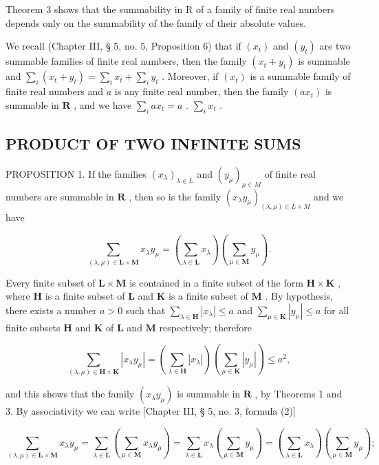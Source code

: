 Theorem 3 shows that the summability in R of a family of finite real numbers depends only on the summability of the family of their absolute values.

We recall (Chapter III, § 5, no. 5, Proposition 6) that if \((x_{t})\) and \((y_{t})\) are two summable families of finite real numbers, then the family \((x_{t} + y_{t})\) is summable and \(\sum_{i}(x_{t} + y_{t}) = \sum_{i}x_{t} + \sum_{i}y_{t}\) . Moreover, if \((x_{t})\) is a summable family of finite real numbers and \(a\) is any finite real number, then the family \((ax_{t})\) is summable in \(\mathbf{R}\) , and we have \(\sum_{i}ax_{t} = a\) . \(\sum_{i}x_{t}\) .

\subsection{PRODUCT OF TWO INFINITE SUMS}

PROPOSITION 1. If the families \((x_{\lambda})_{\lambda \in L}\) and \((y_{\mu})_{\mu \in M}\) of finite real numbers are summable in \(\mathbf{R}\) , then so is the family \((x_{\lambda}y_{\mu})_{(\lambda ,\mu)\in L\times M}\) and we have

\[
\sum_ {(\lambda , \mu) \in \mathbf {L} \times \mathbf {M}} x _ {\lambda} y _ {\mu} = (\sum_ {\lambda \in \mathbf {L}} x _ {\lambda}) (\sum_ {\mu \in \mathbf {M}} y _ {\mu}).\tag{1}
\]

Every finite subset of \(\mathbf{L} \times \mathbf{M}\) is contained in a finite subset of the form \(\mathbf{H} \times \mathbf{K}\) , where \(\mathbf{H}\) is a finite subset of \(\mathbf{L}\) and \(\mathbf{K}\) is a finite subset of \(\mathbf{M}\) . By hypothesis, there exists a number \(a > 0\) such that \(\sum_{\lambda \in \mathbf{H}} |x_{\lambda}| \leqslant a\) and \(\sum_{\mu \in \mathbf{K}} |y_{\mu}| \leqslant a\) for all finite subsets \(\mathbf{H}\) and \(\mathbf{K}\) of \(\mathbf{L}\) and \(\mathbf{M}\) respectively; therefore

\[
\sum_ {(\lambda , \mu) \in \mathbf {H} \times \mathbf {K}} | x _ {\lambda} y _ {\mu} | = (\sum_ {\lambda \in \mathbf {H}} | x _ {\lambda} |) (\sum_ {\mu \in \mathbf {K}} | y _ {\mu} |) \leqslant a ^ {2},
\]

and this shows that the family \((x_{\lambda}y_{\mu})\) is summable in \(\mathbf{R}\) , by Theorems 1 and 3. By associativity we can write {[}Chapter III, § 5, no. 3, formula (2){]}

\[
\sum_ {(\lambda , \mu) \in \mathbf {L} \times \mathbf {M}} x _ {\lambda} y _ {\mu} = \sum_ {\lambda \in \mathbf {L}} (\sum_ {\mu \in \mathbf {M}} x _ {\lambda} y _ {\mu}) = \sum_ {\lambda \in \mathbf {L}} x _ {\lambda} (\sum_ {\mu \in \mathbf {M}} y _ {\mu}) = (\sum_ {\lambda \in \mathbf {L}} x _ {\lambda}) (\sum_ {\mu \in \mathbf {M}} y _ {\mu});
\]

